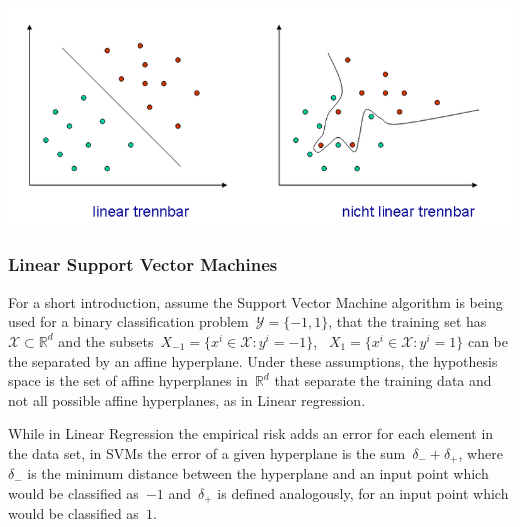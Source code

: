 \includegraphics[scale=0.5]{Images/svm.png}


\subsubsection{Linear Support Vector Machines}

For a short introduction, assume the Support Vector Machine algorithm is being used for a binary classification problem~$\mathcal{Y} = \{-1, 1\}$, that the training set has~$\mathcal{X} \subset \mathbb{R}^d$ and the subsets~$X_{-1} = \{ x^i\in \mathcal{X} \colon y^i = -1 \}$, ~$X_{1} = \{ x^i\in \mathcal{X} \colon y^i = 1 \}$ can be the separated by an affine hyperplane. Under these assumptions, the hypothesis space is the set of affine hyperplanes in~$\mathbb{R}^d$ that separate the training data and not all possible affine hyperplanes, as in Linear regression.

While in Linear Regression the empirical risk adds an error for each element in the data set, in SVMs the error of a given hyperplane is the sum~$\delta_{-} + \delta_{+}$, where~$\delta_{-}$ is the minimum distance between the hyperplane and an input point which would be classified as~$-1$ and~$\delta_{+}$ is defined analogously, for an input point which would be classified as~$1$.


